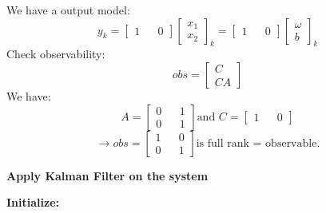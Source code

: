 	We have a output model:
	\begin{equation}
		\boxed{
			y_k = 
			\begin{bmatrix}
				1 &   & 0 
			\end{bmatrix}
			\begin{bmatrix}
				x_1 \\
				x_2 
			\end{bmatrix}_k = 
			\begin{bmatrix}
				1 &   & 0 
			\end{bmatrix}
			\begin{bmatrix}
				\omega \\
				b      
			\end{bmatrix}_k
		}
		\label{sensorfuseq15}
	\end{equation}
	Check observability:
	\[obs = 
	\begin{bmatrix}
		C  \\
		CA 
	\end{bmatrix}\]
	We have:
	\[A = 
	\begin{bmatrix}
		0 &   & 1 \\
		0 &   & 1 
	\end{bmatrix} \text{and } C = 
	\begin{bmatrix}
		1 &   & 0 
	\end{bmatrix}\]
	\[\rightarrow obs = 
	\begin{bmatrix}
		1 &   & 0 \\
		0 &   & 1 
	\end{bmatrix} \text{is full rank = observable.}\]
	\begin{center}
		\textbf{Apply Kalman Filter on the system}
	\end{center}
	\textbf{Initialize:}
